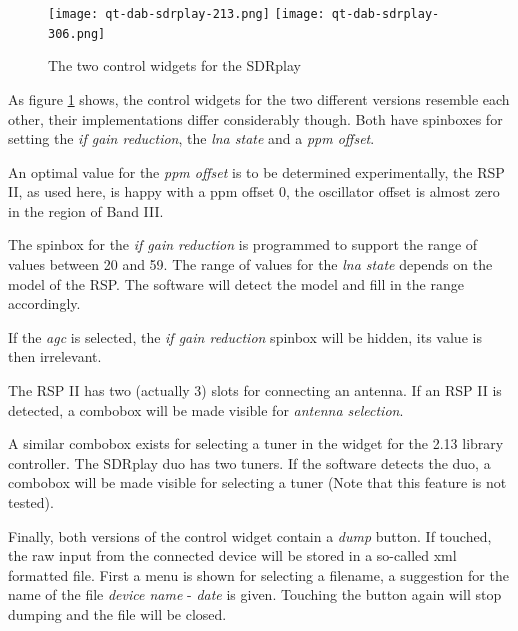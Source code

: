 \documentclass[12pt]{article}
\begin{document}
\begin{figure}[htp]
\centering
\texttt{[image: qt-dab-sdrplay-213.png]}
\texttt{[image: qt-dab-sdrplay-306.png]}
\caption{The two control widgets for the SDRplay}
\label{figure:sdrplay}
\end{figure}
\par
As figure \ref{figure:sdrplay} shows, the control widgets
for the two different versions resemble each other, their implementations
differ considerably though.
Both have spinboxes for setting the {\em if gain reduction}, the
{\em lna state} and a {\em ppm offset}.
\par
An optimal value for the {\em ppm offset} is to be determined experimentally,
the RSP II, as used here, is happy with a ppm offset 0, the oscillator
offset is almost zero in the region of Band III.
\par
The spinbox for the {\em if gain reduction} is programmed to support
the range of values between 20 and 59.
The range of values for the {\em lna state}
depends on the model of the RSP. The software will detect the model
and fill in the range accordingly.
\par
If the {\em agc} is selected, the {\em if gain reduction}
spinbox will be hidden, its value is then irrelevant.
\par
The RSP II has two (actually 3) slots for connecting an antenna. If
an RSP II is detected, a combobox will be made visible for
{\em antenna selection}.
\par
A similar combobox exists for selecting a tuner in the widget
for the 2.13 library controller. The SDRplay duo has
two tuners. If the software detects the duo, a combobox will be made
visible for selecting a tuner (Note that this feature is not tested).
\par
Finally, both versions of the control widget contain
 a {\em dump} button. If touched, the
raw input from the connected device will be stored in a so-called xml
formatted file. First a menu is shown for selecting a filename,
a suggestion for the name of the file {\em device name} - {\em date} is
given.
Touching the button again will stop dumping and the file
will be closed.
\end{document}
